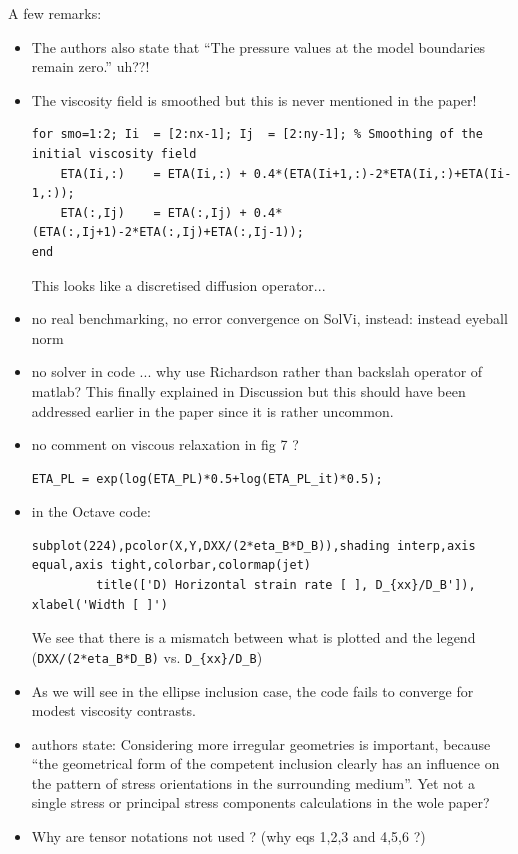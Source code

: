 A few remarks:
\begin{itemize}
\item The authors also state that ``The pressure values at the model boundaries remain zero.'' uh??!
\item The viscosity field is smoothed but this is never mentioned in the paper!
\begin{verbatim}
for smo=1:2; Ii  = [2:nx-1]; Ij  = [2:ny-1]; % Smoothing of the initial viscosity field
    ETA(Ii,:)    = ETA(Ii,:) + 0.4*(ETA(Ii+1,:)-2*ETA(Ii,:)+ETA(Ii-1,:));
    ETA(:,Ij)    = ETA(:,Ij) + 0.4*(ETA(:,Ij+1)-2*ETA(:,Ij)+ETA(:,Ij-1));
end
\end{verbatim}
This looks like a discretised diffusion operator...

\item no real benchmarking, no error convergence on SolVi, instead: instead eyeball norm
\item no solver in code ... why use Richardson rather than backslah operator of matlab? This finally explained in Discussion but
this should have been addressed earlier in the paper since it is rather uncommon.  
\item no comment on viscous relaxation in fig 7 ?
\begin{verbatim}
ETA_PL = exp(log(ETA_PL)*0.5+log(ETA_PL_it)*0.5);
\end{verbatim}
 
\item in the Octave code:
\begin{verbatim}
subplot(224),pcolor(X,Y,DXX/(2*eta_B*D_B)),shading interp,axis equal,axis tight,colorbar,colormap(jet)
         title(['D) Horizontal strain rate [ ], D_{xx}/D_B']), xlabel('Width [ ]')
\end{verbatim}
We see that there is a mismatch between what is plotted and the legend (\verb|DXX/(2*eta_B*D_B)| vs. \verb|D_{xx}/D_B|)

\item As we will see in the ellipse inclusion case, the code fails to converge
for modest viscosity contrasts.

\item authors state: Considering more irregular geometries is important, 
because “the geometrical form of the competent
inclusion clearly has an influence on the pattern of stress orientations in the
surrounding medium”. Yet not a single stress or principal stress components calculations in the wole paper? 

\item Why are tensor notations not used ? (why eqs 1,2,3 and 4,5,6 ?)


\end{itemize}
